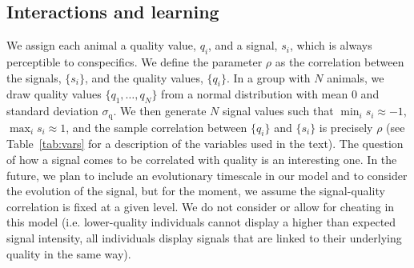 \subsection{Interactions and learning }
We assign each animal a quality value, $q_i$, and a signal, $s_i$, which is always perceptible to conspecifics. We define the parameter $\rho$ as the correlation between the signals, $\{s_i\}$, and the quality values, $\{q_i\}$. In a group with $N$ animals, we draw quality values $\{q_1,\dots,q_N\}$ from a normal distribution with mean $0$ and standard deviation $\sigma_\text{q}$. We then generate $N$ signal values such that $\min_i{s_i}\approx -1$, $\max_i{s_i}\approx 1$, and the sample correlation between $\{q_i\}$ and $\{s_i\}$ is precisely $\rho$ (see Table~\ref{tab:vars} for a description of the variables used in the text). The question of how a signal comes to be correlated with quality is an interesting one. In the future, we plan to include an evolutionary timescale in our model and to consider the evolution of the signal, but for the moment, we assume the signal-quality correlation is fixed at a given level.
We do not consider or allow for cheating in this model (i.e. lower-quality individuals cannot display a higher than expected signal intensity, all individuals display signals that are linked to their underlying quality in the same way).
  
